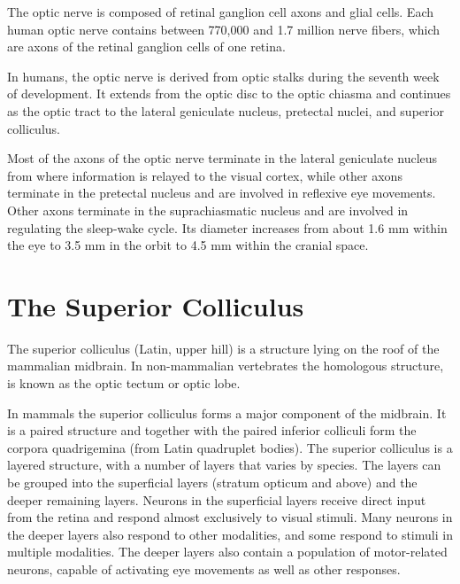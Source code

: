 \documentclass[]{book}
\begin{document}
The optic nerve is composed of retinal ganglion cell axons and glial cells. Each human optic nerve contains between 770,000 and 1.7 million nerve fibers, which are axons of the retinal ganglion cells of one retina.

In humans, the optic nerve is derived from optic stalks during the seventh week of development. It extends from the optic disc to the optic chiasma and continues as the optic tract to the lateral geniculate nucleus, pretectal nuclei, and superior colliculus.

Most of the axons of the optic nerve terminate in the lateral geniculate nucleus from where information is relayed to the visual cortex, while other axons terminate in the pretectal nucleus and are involved in reflexive eye movements. Other axons terminate in the suprachiasmatic nucleus and are involved in regulating the sleep-wake cycle. Its diameter increases from about 1.6 mm within the eye to 3.5 mm in the orbit to 4.5 mm within the cranial space.

\hypertarget{the-superior-colliculus}{%
\section{The Superior Colliculus}\label{the-superior-colliculus}}

The superior colliculus (Latin, upper hill) is a structure lying on the roof of the mammalian midbrain. In non-mammalian vertebrates the homologous structure, is known as the optic tectum or optic lobe.

In mammals the superior colliculus forms a major component of the midbrain. It is a paired structure and together with the paired inferior colliculi form the corpora quadrigemina (from Latin quadruplet bodies). The superior colliculus is a layered structure, with a number of layers that varies by species. The layers can be grouped into the superficial layers (stratum opticum and above) and the deeper remaining layers. Neurons in the superficial layers receive direct input from the retina and respond almost exclusively to visual stimuli. Many neurons in the deeper layers also respond to other modalities, and some respond to stimuli in multiple modalities. The deeper layers also contain a population of motor-related neurons, capable of activating eye movements as well as other responses.
\end{document}
